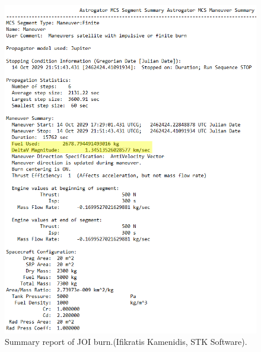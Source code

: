 \begin{figure}[htb]
\centering
\includegraphics[scale=0.5]{figures/Orbiter/JOIres.png}
\caption{Summary report of JOI burn.(Ifikratis Kamenidis, STK Software).}
\end{figure}

